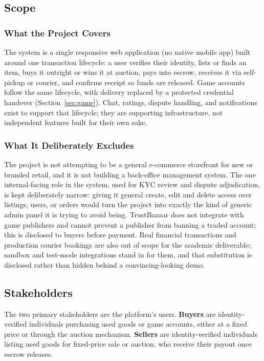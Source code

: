 \documentclass[11pt,a4paper]{article}
\begin{document}
\subsection{Scope}

\subsubsection*{What the Project Covers}

The system is a single responsive web application (no native mobile app) built around one
transaction lifecycle: a user verifies their identity, lists or finds an item, buys it outright or
wins it at auction, pays into escrow, receives it via self-pickup or courier, and confirms receipt so
funds are released. Game accounts follow the same lifecycle, with delivery replaced by a protected
credential handover (Section~\ref{sec:game}). Chat, ratings, dispute handling, and notifications exist
to support that lifecycle; they are supporting infrastructure, not independent features built for
their own sake.

\subsubsection*{What It Deliberately Excludes}

The project is not attempting to be a general e-commerce storefront for new or branded retail, and it
is not building a back-office management system. The one internal-facing role in the system, used for
KYC review and dispute adjudication, is kept deliberately narrow: giving it general create, edit and
delete access over listings, users, or orders would turn the project into exactly the kind of generic
admin panel it is trying to avoid being. TrustBazaar does not integrate with game publishers and cannot
prevent a publisher from banning a traded account; this is disclosed to buyers before payment. Real
financial transactions and production courier bookings are also out of scope for the academic
deliverable; sandbox and test-mode integrations stand in for them, and that substitution is disclosed
rather than hidden behind a convincing-looking demo.

\subsection{Stakeholders}

The two primary stakeholders are the platform's users. \textbf{Buyers} are identity-verified
individuals purchasing used goods or game accounts, either at a fixed price or through the auction
mechanism. \textbf{Sellers} are identity-verified individuals listing used goods for fixed-price sale
or auction, who receive their payout once escrow releases.
\end{document}
